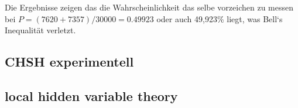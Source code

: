 Die Ergebnisse zeigen das die Wahrscheinlichkeit das selbe vorzeichen zu messen bei $P = (7620 + 7357) / 30000 = 0.49923$ oder auch 49,923\% liegt, was Bell`s Inequalität verletzt.\\


\subsection{CHSH experimentell}
\label{subsec:chsh_experimentell}


\subsection{local hidden variable theory}
\label{subsec:chsh_lhvt}